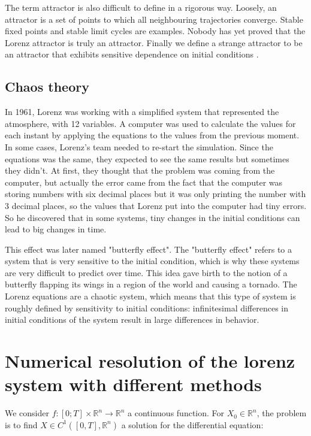 \documentclass[12pt]{article}
\begin{document}
	\noindent The term attractor is also difficult to define in a rigorous way. Loosely, an attractor is a set of points to which all neighbouring trajectories converge. Stable fixed points and
	stable limit cycles are examples. Nobody has yet proved that the Lorenz attractor is truly an attractor. Finally we define a strange attractor to be an attractor that exhibits sensitive dependence on initial conditions \cite{partie1_ref2}.
	
	\subsection{Chaos theory}
	
	In 1961, Lorenz was working with a simplified system that represented the atmosphere, with 12 variables. A computer was used to calculate the values for each instant by applying the equations to the values from the previous moment. In some cases, Lorenz’s team needed to re-start the simulation. Since the equations was the same, they expected to see the same results but sometimes they didn’t. At first, they thought that the problem was coming from the computer, but actually the error came from the fact that the computer was storing numbers with six decimal places but it was only printing the number with 3 decimal places, so the values that Lorenz put into the computer had tiny errors. So he discovered that in some systems, tiny changes in the initial conditions can lead to big changes in time.
	
	\noindent This effect was later named "butterfly effect". The "butterfly effect" refers to a system that is very sensitive to the initial condition, which is why these systems are very difficult to predict over time. This idea gave birth to the notion of a butterfly flapping its wings in a region of the world and causing a tornado.
	The Lorenz equations are a chaotic system, which means that this type of system is roughly defined by sensitivity to initial conditions: infinitesimal differences in initial conditions of the system result in large differences in behavior.
	
	\section{Numerical resolution of the lorenz system with different methods}
	
	We consider $f : [0; T] \times \mathbb{R}^n \rightarrow \mathbb{R}^n$ a continuous function. For $X_0\in \mathbb{R}^n$, the problem is to find  $X\in C^1([0,T],\mathbb{R}^n)$ a solution for the differential equation:
	
\end{document}
